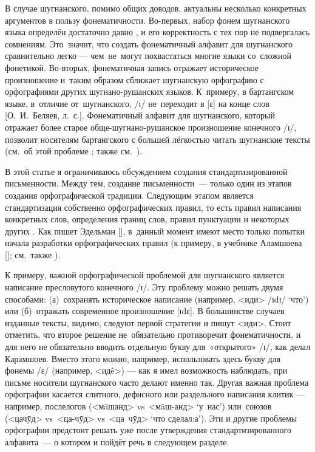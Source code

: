 В случае шугнанского, помимо общих доводов, актуальны несколько конкретных аргументов в пользу фонематичности. Во-первых, набор фонем шугнанского языка определён достаточно давно \parencite{sokolova1953}, и его корректность с тех пор не подвергалась сомнениям. Это~значит, что создать фонематичный алфавит для шугнанского сравнительно легко — чем~не~могут похвастаться многие языки со~сложной фонетикой. Во-вторых, фонематичная запись отражает историческое произношение и~таким образом сближает шугнанскую орфографию с орфографиями других шугнано-рушанских языков. К~примеру, в бартангском языке, в~отличие от~шугнанского, /ɪ/ не~переходит в [ɛ] на конце слов [О.~И.~Беляев, л.~с.]. Фонематичный алфавит для шугнанского, который отражает более старое обще-шугнано-рушанское произношение конечного /ɪ/, позволит носителям бартангского с большей лёгкостью читать шугнанские тексты (см.~об этой проблеме \parencite[110–111]{edelman2016}; также см.~\parencite[151–153]{grenoble_whaley2005}).

В этой статье я ограничиваюсь обсуждением создания стандартизированной письменности. Между тем, создание письменности~— только один из этапов создания орфографической традиции. Следующим этапом является стандартизация собственно орфографических правил, то есть правил написания конкретных слов, определения границ слов, правил пунктуации и некоторых других \parencites[277]{seifart2008}[322]{lupke2011}[106–107]{edelman2016}. Как пишет Эдельман [\cite*[21–22]{edelman2020_steps}], в~данный момент имеют место только попытки начала разработки орфографических правил (к примеру, в учебнике Аламшоева [\cite*{alamshoev2014}]; см.~также \parencite{edelman2010}).

К примеру, важной орфографической проблемой для шугнанского является написание пресловутого конечного /ɪ/. Эту проблему можно решать двумя способами: (а)~сохранять историческое написание (например, <иди> /ɪdɪ/ ‘что’) или (б)~отражать современное произношение [ɪdɛ]. В большинстве случаев изданные тексты, видимо, следуют первой стратегии и пишут <иди>. Стоит отметить, что второе решение не~обязательно противоречит фонематичности, и для него не обязательно вводить отдельную букву для~«открытого» /ɪ/, как делал Карамшоев. Вместо этого можно, например, использовать здесь букву для фонемы /ɛ/ (например, <идê>) — как я имел возможность наблюдать, при письме носители шугнанского часто делают именно так. Другая важная проблема орфографии касается слитного, дефисного или раздельного написания клитик — например, послелогов (<мāшанд> vs~<мāш-анд> ‘у~нас’) или~союзов (<цачӯд> vs~<ца-чӯд> vs~<ца~чӯд> ‘что сделал:а’). Эти и другие проблемы орфографии предстоит решать уже после утверждения стандартизированного алфавита~— о котором и пойдёт речь в следующем разделе.

